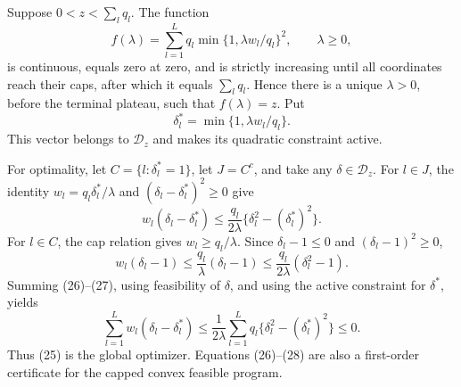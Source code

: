 Suppose \(0<z<\sum_lq_l\). The function
\[
 f(\lambda)=\sum_{l=1}^Lq_l\min\{1,\lambda w_l/q_l\}^2,
 \qquad \lambda\ge0,
\tag{24}
\]
is continuous, equals zero at zero, and is strictly increasing until all coordinates reach their caps, after which it equals \(\sum_lq_l\). Hence there is a unique \(\lambda>0\), before the terminal plateau, such that \(f(\lambda)=z\). Put
\[
 \delta_l^*=\min\{1,\lambda w_l/q_l\}.
\tag{25}
\]
This vector belongs to \(\mathcal D_z\) and makes its quadratic constraint active.

For optimality, let \(C=\{l:\delta_l^*=1\}\), let \(J=C^c\), and take any \(\delta\in\mathcal D_z\). For \(l\in J\), the identity \(w_l=q_l\delta_l^*/\lambda\) and \((\delta_l-\delta_l^*)^2\ge0\) give
\[
 w_l(\delta_l-\delta_l^*)
 \le\frac{q_l}{2\lambda}\{\delta_l^2-(\delta_l^*)^2\}.
\tag{26}
\]
For \(l\in C\), the cap relation gives \(w_l\ge q_l/\lambda\). Since \(\delta_l-1\le0\) and \((\delta_l-1)^2\ge0\),
\[
 w_l(\delta_l-1)
 \le\frac{q_l}{\lambda}(\delta_l-1)
 \le\frac{q_l}{2\lambda}(\delta_l^2-1).
\tag{27}
\]
Summing (26)--(27), using feasibility of \(\delta\), and using the active constraint for \(\delta^*\), yields
\[
 \sum_{l=1}^Lw_l(\delta_l-\delta_l^*)
 \le\frac1{2\lambda}\sum_{l=1}^Lq_l\{\delta_l^2-(\delta_l^*)^2\}
 \le0.
\tag{28}
\]
Thus (25) is the global optimizer. Equations (26)--(28) are also a first-order certificate for the capped convex feasible program.

